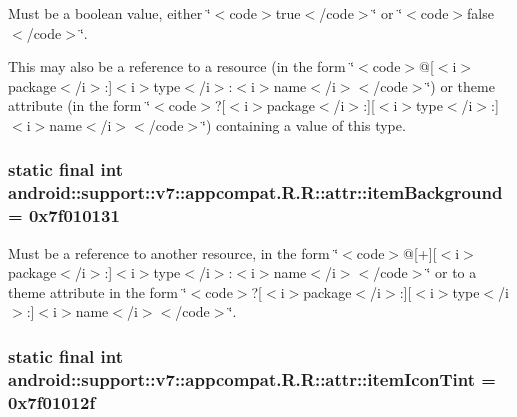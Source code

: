 Must be a boolean value, either \char`\"{}$<$code$>$true$<$/code$>$\char`\"{} or \char`\"{}$<$code$>$false$<$/code$>$\char`\"{}. 

This may also be a reference to a resource (in the form \char`\"{}$<$code$>$@\mbox{[}$<$i$>$package$<$/i$>$:\mbox{]}$<$i$>$type$<$/i$>$:$<$i$>$name$<$/i$>$$<$/code$>$\char`\"{}) or theme attribute (in the form \char`\"{}$<$code$>$?\mbox{[}$<$i$>$package$<$/i$>$:\mbox{]}\mbox{[}$<$i$>$type$<$/i$>$:\mbox{]}$<$i$>$name$<$/i$>$$<$/code$>$\char`\"{}) containing a value of this type. \hypertarget{classandroid_1_1support_1_1v7_1_1appcompat_1_1_r_1_1attr_3c4f9aaff1af6afeaee61e3478cac03d}{
\subsubsection[{itemBackground}]{\setlength{\rightskip}{0pt plus 5cm}static final int android::support::v7::appcompat.R.R::attr::itemBackground = 0x7f010131}}
\label{classandroid_1_1support_1_1v7_1_1appcompat_1_1_r_1_1attr_3c4f9aaff1af6afeaee61e3478cac03d}


Must be a reference to another resource, in the form \char`\"{}$<$code$>$@\mbox{[}+\mbox{]}\mbox{[}$<$i$>$package$<$/i$>$:\mbox{]}$<$i$>$type$<$/i$>$:$<$i$>$name$<$/i$>$$<$/code$>$\char`\"{} or to a theme attribute in the form \char`\"{}$<$code$>$?\mbox{[}$<$i$>$package$<$/i$>$:\mbox{]}\mbox{[}$<$i$>$type$<$/i$>$:\mbox{]}$<$i$>$name$<$/i$>$$<$/code$>$\char`\"{}. \hypertarget{classandroid_1_1support_1_1v7_1_1appcompat_1_1_r_1_1attr_39c38045f45226936a4b171ad3a11454}{
\subsubsection[{itemIconTint}]{\setlength{\rightskip}{0pt plus 5cm}static final int android::support::v7::appcompat.R.R::attr::itemIconTint = 0x7f01012f}}
\label{classandroid_1_1support_1_1v7_1_1appcompat_1_1_r_1_1attr_39c38045f45226936a4b171ad3a11454}


